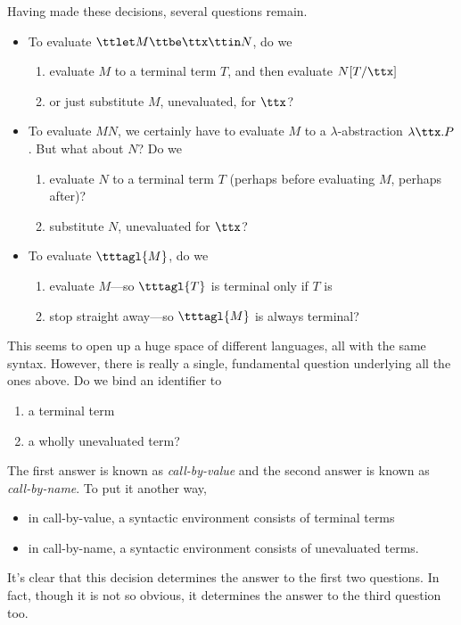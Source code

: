 \documentclass[runningheads,12pt]{llncs}
\begin{document}
Having made these decisions, several questions remain.
\begin{itemize}
\item To evaluate $\ttlet M \ttbe \ttx \ttin N$, do we
  \begin{enumerate}
  \item evaluate $M$ to a terminal term $T$, and then evaluate $N[T/\ttx]$
  \item or just substitute $M$, unevaluated, for $\ttx$?
  \end{enumerate}
\item To evaluate $MN$, we certainly have to evaluate $M$ to a $\lambda$-abstraction $\lambda \ttx. P$.  But what about $N$?  Do we 
  \begin{enumerate}
  \item evaluate $N$ to a terminal term $T$ (perhaps before evaluating $M$, perhaps after)?  
  \item substitute $N$, unevaluated for $\ttx$?
    \end{enumerate}
\item To evaluate $\tttagl{M}$, do we 
  \begin{enumerate}
   \item evaluate $M$---so $\tttagl{T}$ is terminal only if $T$ is
 \item stop straight away---so $\tttagl{M}$ is always terminal?
  \end{enumerate}
\end{itemize}

This seems to open up a huge space of different languages, all with the same syntax.  However, there is really a single, fundamental question underlying all the ones above.  Do we bind an identifier to 
\begin{enumerate}
\item a terminal term
\item a wholly unevaluated term?
\end{enumerate}
The first answer is known as \emph{call-by-value} and the second answer is known as \emph{call-by-name}.  To put it another way,
\begin{itemize}
\item in call-by-value, a syntactic environment consists of terminal terms
\item in call-by-name, a syntactic environment consists of unevaluated terms.
\end{itemize}
It's clear that this decision determines the answer to the first two questions.  In fact, though it is not so obvious, it determines the answer to the third question too.  
\end{document}
